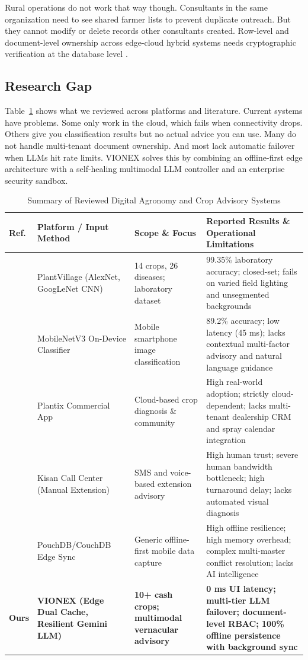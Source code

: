 \documentclass[conference]{IEEEtran}
\begin{document}
Rural operations do not work that way though. Consultants in the same organization need to see shared farmer lists to prevent duplicate outreach. But they cannot modify or delete records other consultants created. Row-level and document-level ownership across edge-cloud hybrid systems needs cryptographic verification at the database level \cite{firebase2024}.

\subsection{Research Gap}
Table~\ref{tab:related_work} shows what we reviewed across platforms and literature. Current systems have problems. Some only work in the cloud, which fails when connectivity drops. Others give you classification results but no actual advice you can use. Many do not handle multi-tenant document ownership. And most lack automatic failover when LLMs hit rate limits. VIONEX solves this by combining an offline-first edge architecture with a self-healing multimodal LLM controller and an enterprise security sandbox.

\begin{table}[t]
\caption{Summary of Reviewed Digital Agronomy and Crop Advisory Systems}
\label{tab:related_work}
\centering
\begin{tabularx}{\textwidth}{l p{3.6cm} p{3.2cm} X}
\toprule
\textbf{Ref.} & \textbf{Platform / Input Method} & \textbf{Scope \& Focus} & \textbf{Reported Results \& Operational Limitations} \\
\midrule
\cite{mohanty2016} & PlantVillage (AlexNet, GoogLeNet CNN) & 14 crops, 26 diseases; laboratory dataset & 99.35\% laboratory accuracy; closed-set; fails on varied field lighting and unsegmented backgrounds \\
\cite{howard2019} & MobileNetV3 On-Device Classifier & Mobile smartphone image classification & 89.2\% accuracy; low latency (45 ms); lacks contextual multi-factor advisory and natural language guidance \\
\cite{caria2021} & Plantix Commercial App & Cloud-based crop diagnosis \& community & High real-world adoption; strictly cloud-dependent; lacks multi-tenant dealership CRM and spray calendar integration \\
\cite{rathore2020} & Kisan Call Center (Manual Extension) & SMS and voice-based extension advisory & High human trust; severe human bandwidth bottleneck; high turnaround delay; lacks automated visual diagnosis \\
\cite{shapiro2011} & PouchDB/CouchDB Edge Sync & Generic offline-first mobile data capture & High offline resilience; high memory overhead; complex multi-master conflict resolution; lacks AI intelligence \\
\textbf{Ours} & \textbf{VIONEX (Edge Dual Cache, Resilient Gemini LLM)} & \textbf{10+ cash crops; multimodal vernacular advisory} & \textbf{0 ms UI latency; multi-tier LLM failover; document-level RBAC; 100\% offline persistence with background sync} \\
\bottomrule
\end{tabularx}
\end{table}
\end{document}
